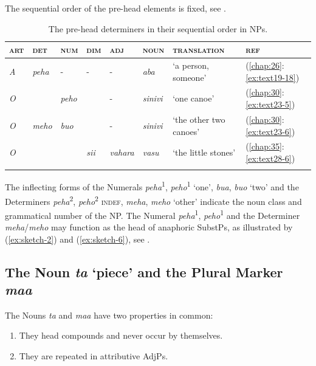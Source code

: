 \documentclass[output=paper]{langscibook}
\begin{document}
The sequential order of the pre-head elements is fixed, see .


\begin{table}
    \caption{The pre-head determiners in their sequential order in NPs.} \label{tab:prehead}
\begin{tabularx}{\textwidth}{llllllll}
    \lsptoprule
    \textsc{art}&\textsc{det}&\textsc{num}&\textsc{dim}&\textsc{adj}&\textsc{noun}&\textsc{translation}&\textsc{ref}\\
    \midrule
    \textit{A}&\textit{peha}&-&-&-&\textit{aba}&`a person, someone'&(\ref{chap:26}:\ref{ex:text19-18})\\
    \textit{O}&&\textit{peho}&&-&\textit{sinivi}&`one canoe'&(\ref{chap:30}:\ref{ex:text23-5})\\
    \textit{O}&\textit{meho}&\textit{buo}&&-&\textit{sinivi}&`the other two canoes'&(\ref{chap:30}:\ref{ex:text23-6})\\
    \textit{O}&&&\textit{sii}&\textit{vahara}&\textit{vasu}&`the little stones'&(\ref{chap:35}:\ref{ex:text28-6})\\
    \lspbottomrule
\end{tabularx}
\end{table}


The inflecting forms of the Numerals \textit{peha}\textsuperscript{1}, \textit{peho}\textsuperscript{1} `one', \textit{bua}, \textit{buo} `two' and the Determiners \textit{peha}\textsuperscript{2}, \textit{peho}\textsuperscript{2} \textsc{indef}, \textit{meha}, \textit{meho} `other' indicate the noun class and grammatical number of the NP. The Numeral \textit{peha}\textsuperscript{1}, \textit{peho}\textsuperscript{1} and the Determiner \textit{meha}/\textit{meho} may function as the head of anaphoric SubstPs, as illustrated by (\ref{ex:sketch-2}) and (\ref{ex:sketch-6}), see .

\subsection{The Noun \textit{ta} `piece' and the \label{sec:nounta} Plural Marker \textit{maa}}\label{sec:pluralmaa}

The Nouns \textit{ta} and \textit{maa} have two properties in common:

\begin{enumerate}
    \item They head compounds and never occur by themselves.
    \item They are repeated in attributive AdjPs.
\end{enumerate}
\end{document}
